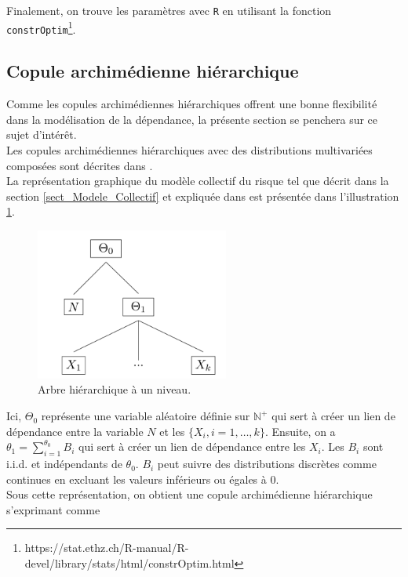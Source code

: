 \documentclass{article}
\renewcommand{\figurename}{Illustration}
\begin{document}
		Finalement, on trouve les paramètres avec \texttt{R} en utilisant la fonction \texttt{constrOptim}\footnote{https://stat.ethz.ch/R-manual/R-devel/library/stats/html/constrOptim.html}.
		

	\subsection{Copule archimédienne hiérarchique}	
	Comme les copules archimédiennes hiérarchiques offrent une bonne flexibilité dans la modélisation de la dépendance, la présente section se penchera sur ce sujet d'intérêt.\\
	
	Les copules archimédiennes hiérarchiques avec des distributions multivariées composées sont décrites dans \cite{Itre4}.\\
	La représentation graphique du modèle collectif du risque tel que décrit dans la section \ref{sect_Modele_Collectif} et expliquée dans \cite{Itre5} est présentée dans l'illustration \ref{graph_hierarchie}.
	
	\begin{figure}[H]
		\centering
		\includegraphics[height=5cm]{Hierarchie}
		\renewcommand{\figurename}{Illustration}
		\caption{Arbre hiérarchique à un niveau.} \label{graph_hierarchie}
	\end{figure}

	Ici, $\Theta_0$ représente une variable aléatoire définie sur $\mathbb{N}^+$ qui sert à créer un lien de dépendance entre la variable $N$ et les $\{X_i, i=1,\dots , k\}$. Ensuite, on a $\theta_1 = \sum_{i=1}^{\theta_0} B_i$ qui sert à créer un lien de dépendance entre les $X_i$. Les $B_i$ sont i.i.d. et indépendants de $\theta_0$. $B_i$ peut suivre des distributions discrètes comme continues en excluant les valeurs inférieurs ou égales à 0. \\
	
	Sous cette représentation, on obtient une copule archimédienne hiérarchique s'exprimant comme
	
\end{document}
